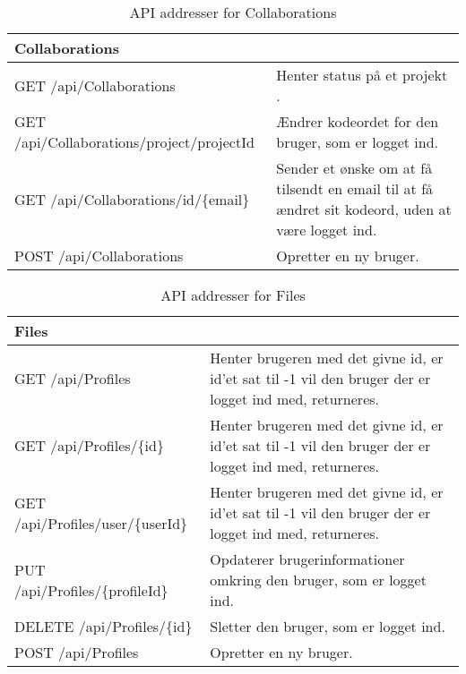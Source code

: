 \begin{table}[H]
	\centering
	\caption{API addresser for Collaborations}
	\label{tab:web_user}
	\begin{tabular}{p{5cm}|p{11cm}}
		\hline
		\multicolumn{2}{l}{\textbf{Collaborations}}\\
		\hline
		GET \newline
		/api/Collaborations &
		Henter status på et projekt . \\
		\hline
        GET \newline
		/api/Collaborations/project/{projectId} &
		Ændrer kodeordet for den bruger, som er logget ind. \\
		\hline
		GET \newline
		/api/Collaborations/{id}/\{email\} &
		Sender et ønske om at få tilsendt en email til at få ændret sit kodeord, uden at være logget ind. 
		\\
		\hline
		POST \newline
		/api/Collaborations &
		Opretter en ny bruger. \\
		\hline
	
	\end{tabular}
\end{table}

\begin{table}[H]
	\centering
	\caption{API addresser for Files}
	\label{tab:web_user}
	\begin{tabular}{p{5cm}|p{11cm}}
		\hline
		\multicolumn{2}{l}{\textbf{Files}}\\
		\hline
		GET \newline
		/api/Profiles &
		Henter brugeren med det givne id, er id'et sat til -1 vil den bruger der er logget ind med, returneres. \\
        \hline
        GET \newline
		/api/Profiles/\{id\} &
		Henter brugeren med det givne id, er id'et sat til -1 vil den bruger der er logget ind med, returneres. \\
        \hline
        GET \newline
		/api/Profiles/user/\{userId\} &
		Henter brugeren med det givne id, er id'et sat til -1 vil den bruger der er logget ind med, returneres. \\
		\hline
		PUT \newline
		/api/Profiles/\{profileId\} &
		Opdaterer brugerinformationer omkring den bruger, som er logget ind. \\
		\hline
		DELETE \newline
		/api/Profiles/\{id\} &
		Sletter den bruger, som er logget ind. \\
		\hline
		POST \newline
		/api/Profiles &
		Opretter en ny bruger. \\
		\hline
	
	\end{tabular}
\end{table}

